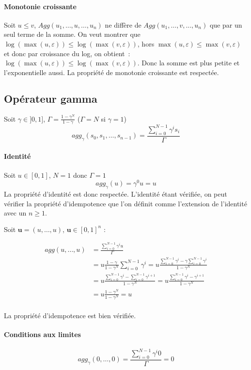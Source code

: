 \paragraph{Monotonie croissante}
Soit $u \leq v$, $Agg(u_1,\dots,u,\dots,u_n)$ ne diffère de $ Agg(u_1,\dots,v,\dots,u_n)$ que par un seul terme de la somme.
On veut montrer que $\log(\max(u,\varepsilon))\leq \log(\max(v,\varepsilon))$, hors $\max(u,\varepsilon) \leq \max(v,\varepsilon)$ et donc par croissance du log, on obtient : $\log(\max(u,\varepsilon))\leq \log(\max(v,\varepsilon))$. Donc la somme est plus petite et l'exponentielle aussi. La propriété de monotonie croissante est respectée.

\subsection{Opérateur gamma}
Soit $\gamma\in ]0,1]$, $\Gamma = \frac{1-\gamma^{N}}{1-\gamma}$ ($\Gamma =N $ si $\gamma=1$)
    \begin{equation}
        agg_{\gamma}(s_0,s_1,\dots,s_{n-1}) = \frac{ \sum_{i=0}^{N-1}\gamma^is_i}{\Gamma}
    \end{equation}
\paragraph{Identité}
Soit $u\in [0,1]$, $N=1$ donc $\Gamma =1$
$$agg_\gamma(u)= \gamma^0u= u$$
La propriété d'identité est donc respectée.
L'identité étant vérifiée, on peut vérifier la propriété d'idempotence que l'on définit comme l'extension de l'identité avec un $n \geq 1$.

Soit $\textbf{u} = (u,\dots,u)$, $\textbf{u} \in [0,1]^n$ :

\begin{align*}
    agg(u,\dots,u) & = \frac{\sum_{i=0}^{N-1} \gamma^i u}{\Gamma}  \\
    & =u\frac{1-\gamma}{1-\gamma^N}\sum_{i=0}^{N-1}\gamma^i  = u \frac{\sum_{i=0}^{N-1}\gamma^i- \gamma\sum_{i=0}^{N-1}\gamma^i}{1- \gamma^N}\\
    & = u \frac{\sum_{i=0}^{N-1}\gamma^i- \sum_{i=0}^{N-1}\gamma^{i+1}}{1- \gamma^N} = u \frac{\sum_{i=0}^{N-1}\gamma^i- \gamma^{i+1}}{1- \gamma^N} \\
    &= u \frac{1-\gamma^N}{1-\gamma^N} = u\\  
\end{align*}

La propriété d'idempotence est bien vérifiée.

\paragraph{Conditions aux limites}
$$agg_\gamma(0,\dots,0) = \frac{ \sum_{i=0}^{N-1}\gamma^i0}{\Gamma}=0$$


